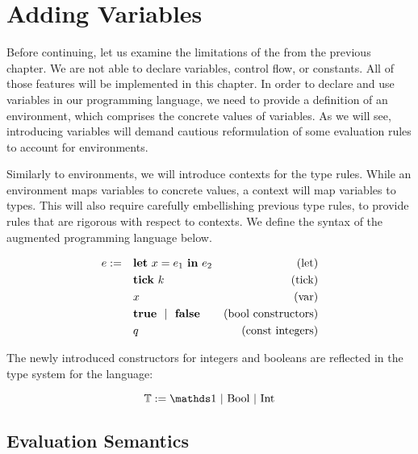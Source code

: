 \chapter{Adding Variables}

Before continuing, let us examine the limitations of the  from the previous chapter. We are not able to declare variables, control flow, or constants. All of those features will be implemented in this chapter. In order to declare and use variables in our programming language, we need to provide a definition of an environment, which comprises the concrete values of variables. As we will see, introducing variables will demand cautious reformulation of some evaluation rules to account for environments.

Similarly to environments, we will introduce contexts for the type rules. While an environment maps variables to concrete values, a context will map variables to types. This will also require carefully embellishing previous type rules, to provide rules that are rigorous with respect to contexts. We define the syntax of the augmented programming language below.

\begin{definition}
   \label{def:prog-lang-5}

\begin{align*}
   e := ~~~ & \mathbf{let}~x = e_1~\mathbf{in}~e_2		& \text{(let)}\\
            & \mathbf{tick}~k				& \text{(tick)}\\
	    & x					& \text{(var)}\\
	    & \mathbf{true} ~~| ~~\mathbf{false}		& \text{(bool constructors)}\\
	    & q					& \text{(const integers)}\\
\end{align*}
\end{definition}

The newly introduced constructors for integers and booleans are reflected in the type system for the language:

\begin{definition}\label{def:type-system-5}
   \[
      \type := \unit~|~\text{\bool}~|~\text{\typeint}
   \]
\end{definition}

\section{Evaluation Semantics}

